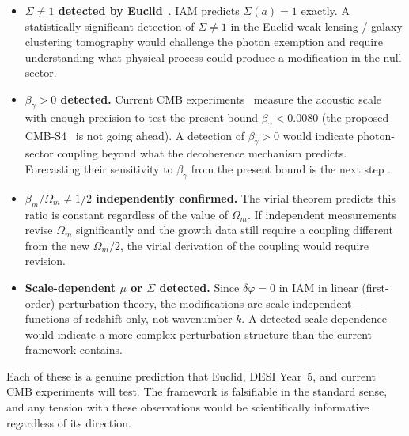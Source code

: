 \begin{itemize}
\item \textbf{$\Sigma\neq1$ detected by Euclid}~\cite{Euclid2025}. IAM predicts $\Sigma(a)=1$ exactly. A statistically significant detection of
$\Sigma\neq1$ in the Euclid weak lensing / galaxy clustering tomography would challenge the photon exemption and require understanding what physical
process could produce a modification in the null sector. \prediction
\item \textbf{$\beta_\gamma>0$ detected.} Current CMB experiments~\cite{Rosenberg2022,Aiola2020,Ade2019SO} measure the acoustic scale with enough precision to test the
present bound $\beta_\gamma<0.0080$ (the proposed CMB-S4~\cite{Abazajian2016} is not going ahead). A detection of $\beta_\gamma>0$ would indicate photon-sector coupling beyond what the decoherence mechanism predicts.
Forecasting their sensitivity to $\beta_\gamma$ from the present bound is the next step \openprob.
\item \textbf{$\beta_m/\Omega_m\neq1/2$ independently confirmed.} The virial theorem predicts this ratio is constant regardless of the value of $\Omega_m$.
If independent measurements revise $\Omega_m$ significantly and the growth data still require a coupling different from the new $\Omega_m/2$, the virial
derivation of the coupling would require revision. \prediction
\item \textbf{Scale-dependent $\mu$ or $\Sigma$ detected.} Since $\delta\varphi=0$ in IAM in linear (first-order) perturbation theory, the modifications
are scale-independent---functions of redshift only, not wavenumber $k$. A detected scale dependence would indicate a more complex perturbation structure
than the current framework contains. \prediction
\end{itemize}
Each of these is a genuine prediction that Euclid, DESI Year~5, and current CMB experiments will test. The framework is falsifiable in the standard sense, and any tension
with these observations would be scientifically informative regardless of its direction.
